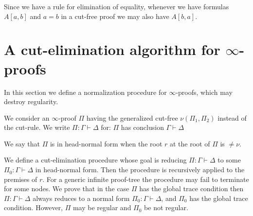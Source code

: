 \documentclass[a4paper,12pt]{article}
\begin{document}
%
%
%

Since we have a rule for elimination of equality, whenever we have formulas $A[a,b]$ and $a=b$ in a cut-free proof we may also have $A[b,a]$.



\section{A cut-elimination algorithm for $\infty$-proofs}
In this section we define a normalization procedure for $\infty$-proofs, which may destroy regularity.

We consider an $\infty$-proof $\Pi$ having the generalized cut-free $\nu(\Pi_1, \Pi_2)$ instead of the cut-rule. We write $\Pi: \Gamma \vdash \Delta$ for: $\Pi$ has conclusion $\Gamma \vdash \Delta$ 

We say that $\Pi$ is in head-normal form when the root $r$ at the root of $\Pi$ is $\not = \nu$. 

We define a cut-elimination procedure whose goal is reducing $\Pi: \Gamma \vdash \Delta$ to some $\Pi_0: \Gamma \vdash \Delta$ in head-normal form. Then the procedure is recursively applied to the premises of $r$. For a generic infinite proof-tree the procedure may fail to terminate for some nodes. We prove that in the case $\Pi$ has the global trace condition then $\Pi: \Gamma \vdash \Delta$ always reduces to a normal form $\Pi_0: \Gamma \vdash \Delta$, and $\Pi_0$ has the global trace condition. However, $\Pi$ may be regular and $\Pi_0$ be not regular.
  
\end{document}
